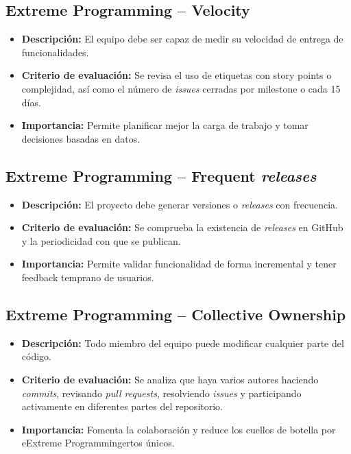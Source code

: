 \subsection{Extreme Programming – Velocity}

\begin{itemize}
  \item \textbf{Descripción:} El equipo debe ser capaz de medir su velocidad de entrega de funcionalidades.
  \item \textbf{Criterio de evaluación:} Se revisa el uso de etiquetas con story points o complejidad, así como el número de \textit{issues} cerradas por milestone o cada 15 días.
  \item \textbf{Importancia:} Permite planificar mejor la carga de trabajo y tomar decisiones basadas en datos.
\end{itemize}

\subsection{Extreme Programming – Frequent \textit{releases}}

\begin{itemize}
  \item \textbf{Descripción:} El proyecto debe generar versiones o \textit{releases} con frecuencia.
  \item \textbf{Criterio de evaluación:} Se comprueba la existencia de \textit{releases} en GitHub y la periodicidad con que se publican.
  \item \textbf{Importancia:} Permite validar funcionalidad de forma incremental y tener feedback temprano de usuarios.
\end{itemize}

\subsection{Extreme Programming – Collective Ownership}

\begin{itemize}
  \item \textbf{Descripción:} Todo miembro del equipo puede modificar cualquier parte del código.
  \item \textbf{Criterio de evaluación:} Se analiza que haya varios autores haciendo \textit{commits}, revisando \textit{pull requests}, resolviendo \textit{issues} y participando activamente en diferentes partes del repositorio.
  \item \textbf{Importancia:} Fomenta la colaboración y reduce los cuellos de botella por eExtreme Programmingertos únicos.
\end{itemize}

